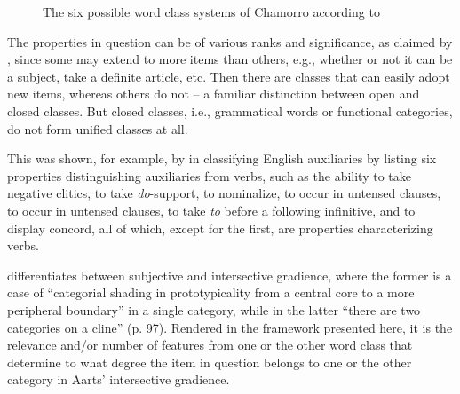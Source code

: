 \documentclass[output=paper]{langsci/langscibook}
\begin{document}
\begin{figure}
\caption{The six possible word class systems of Chamorro according to
\textcite{Haspelmath2012}}\label{tab:27.2}
\end{figure}

The properties in question can be of various ranks and significance, as claimed
by \citet{Crystal1967}, since some may extend to more items than others, e.g.,
whether or not it can be a subject, take a definite article, etc. Then there
are classes that can easily adopt new items, whereas others do not – a familiar
distinction between open and closed classes. But closed classes, i.e.,
grammatical words or functional categories, do not form unified classes at all.

This was shown, for example, by \citet{Radford1976} in classifying English
auxiliaries by listing six properties distinguishing auxiliaries from verbs,
such as the ability to take negative clitics, to take \emph{do}-support, to
nominalize, to occur in untensed clauses, to occur in untensed clauses, to take
\emph{to} before a following infinitive, and to display concord, all of which,
except for the first, are properties characterizing verbs.

\citet{Aarts2007} differentiates between subjective and intersective gradience,\linebreak
where the former is a case of “categorial shading in prototypicality from a
central core to a more peripheral boundary” in a single category, while in the
latter “there are two categories on a cline” (p. 97). Rendered in the framework
presented here, it is the relevance and/or number of features from one or the
other word class that determine to what degree the item in question belongs
to one or the other category in Aarts’ intersective gradience.
\end{document}
